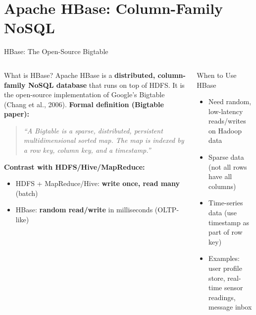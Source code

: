 \documentclass[aspectratio=169,10pt]{beamer}
\begin{document}
\section{Apache HBase: Column-Family NoSQL}

\begin{frame}{HBase: The Open-Source Bigtable}
  \begin{columns}[T]
      \begin{block}{What is HBase?}
        Apache HBase is a \textbf{distributed, column-family NoSQL database} that runs on top of HDFS.  It is the open-source implementation of Google's Bigtable (Chang et al., 2006).
        \vspace{4pt}
        \textbf{Formal definition (Bigtable paper):}
        \begin{quote}
          \itshape ``A Bigtable is a sparse, distributed, persistent multidimensional sorted map.  The map is indexed by a row key, column key, and a timestamp.''
        \end{quote}
        \textbf{Contrast with HDFS/Hive/MapReduce:}
        \begin{itemize}
          \small
          \item HDFS + MapReduce/Hive: \textbf{write once, read many} (batch)
          \item HBase: \textbf{random read/write} in milliseconds (OLTP-like)
        \end{itemize}
      \end{block}
      \vspace{4pt}
      \begin{alertblock}{When to Use HBase}
        \begin{itemize}
          \small
          \item Need random, low-latency reads/writes on Hadoop data
          \item Sparse data (not all rows have all columns)
          \item Time-series data (use timestamp as part of row key)
          \item Examples: user profile store, real-time sensor readings, message inbox
        \end{itemize}
      \end{alertblock}


\end{columns}
\end{frame}
\end{document}
